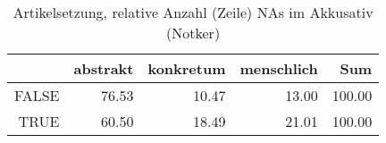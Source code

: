 \begin{table}[ht]
\centering
\begin{tabular}{rrrrr}
  \hline
 & abstrakt & konkretum & menschlich & Sum \\ 
  \hline
FALSE & 76.53 & 10.47 & 13.00 & 100.00 \\ 
  TRUE & 60.50 & 18.49 & 21.01 & 100.00 \\ 
   \hline
\end{tabular}
\caption{Artikelsetzung, relative Anzahl (Zeile) NAs im Akkusativ (Notker)} 
\end{table}
